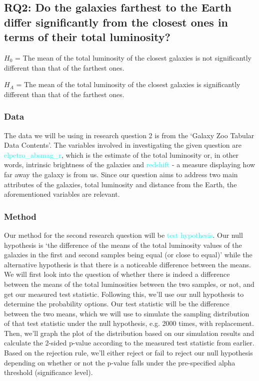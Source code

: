\documentclass[12pt]{article}
\begin{document}
\subsection{RQ2: Do the galaxies farthest to the Earth differ significantly from the closest ones in terms of their total luminosity?}

\noindent $H_0$ = The mean of the total luminosity of the closest galaxies is not significantly different than that of the farthest ones.

\noindent $H_A$ = The mean of the total luminosity of the closest galaxies is significantly different than that of the farthest ones.


\subsubsection{Data}

The data we will be using in research question 2 is from the `Galaxy Zoo Tabular Data Contents'. The variables involved in investigating the given question are \textcolor{cyan}{elpetro\_absmag\_r}, which is the estimate of the total luminosity or, in other words, intrinsic brightness of the galaxies and \textcolor{cyan}{redshift} - a measure displaying how far away the galaxy is from us. Since our question aims to address two main attributes of the galaxies, total luminosity and distance from the Earth, the aforementioned variables are relevant.

\subsubsection{Method}

Our method for the second research question will be \textcolor{cyan}{test hypothesis}. Our null hypothesis is `the difference of the means of the total luminosity values of the galaxies in the first and second samples being equal (or close to equal)' while the alternative hypothesis is that there is a noticeable difference between the means. We will first look into the question of whether there is indeed a difference between the means of the total luminosities between the two samples, or not, and get our measured test statistic. Following this, we'll use our null hypothesis to determine the probability options. Our test statistic will be the difference between the two means, which we will use to simulate the sampling distribution of that test statistic under the null hypothesis, e.g. 2000 times, with replacement. Then, we'll graph the plot of the distribution based on our simulation results and calculate the 2-sided p-value according to the measured test statistic from earlier. Based on the rejection rule, we'll either reject or fail to reject our null hypothesis depending on whether or not the p-value falls under the pre-specified alpha threshold (significance level). 
\end{document}

